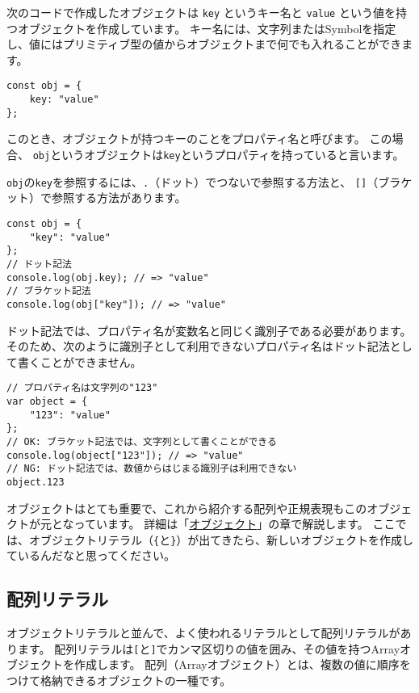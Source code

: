 次のコードで作成したオブジェクトは \texttt{key}
というキー名と \texttt{value}
という値を持つオブジェクトを作成しています。
キー名には、文字列またはSymbolを指定し、値にはプリミティブ型の値からオブジェクトまで何でも入れることができます。

\begin{lstlisting}
const obj = {
    key: "value"
};
\end{lstlisting}

このとき、オブジェクトが持つキーのことをプロパティ名と呼びます。
この場合、
\texttt{obj}というオブジェクトは\texttt{key}というプロパティを持っていると言います。

\texttt{obj}の\texttt{key}を参照するには、\texttt{.}（ドット）でつないで参照する方法と、
\texttt{[]}（ブラケット）で参照する方法があります。

\begin{lstlisting}
const obj = {
    "key": "value"
};
// ドット記法
console.log(obj.key); // => "value"
// ブラケット記法
console.log(obj["key"]); // => "value"
\end{lstlisting}

ドット記法では、プロパティ名が変数名と同じく識別子である必要があります。
そのため、次のように識別子として利用できないプロパティ名はドット記法として書くことができません。

\begin{lstlisting}
// プロパティ名は文字列の"123"
var object = {
    "123": "value"
};
// OK: ブラケット記法では、文字列として書くことができる
console.log(object["123"]); // => "value"
// NG: ドット記法では、数値からはじまる識別子は利用できない
object.123
\end{lstlisting}

オブジェクトはとても重要で、これから紹介する配列や正規表現もこのオブジェクトが元となっています。
詳細は「\hyperlink{object}{オブジェクト}」の章で解説します。
ここでは、オブジェクトリテラル（\texttt{\{}と\texttt{\}}）が出てきたら、新しいオブジェクトを作成しているんだなと思ってください。

\hypertarget{array-literal}{%
\subsection{配列リテラル}\label{array-literal}}

オブジェクトリテラルと並んで、よく使われるリテラルとして配列リテラルがあります。
配列リテラルは\texttt{[}と\texttt{]}でカンマ区切りの値を囲み、その値を持つArrayオブジェクトを作成します。
配列（Arrayオブジェクト）とは、複数の値に順序をつけて格納できるオブジェクトの一種です。

